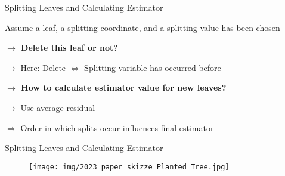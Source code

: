 \documentclass{beamer}
\begin{document}
\begin{frame}{Splitting Leaves and Calculating Estimator}

    Assume a leaf, a splitting coordinate, and a splitting value has been chosen

    \vspace*{.5cm}

    \textbf{$\rightarrow$ Delete this leaf or not?}

    \hspace*{.5cm} $\rightarrow$ Here: Delete \(\Leftrightarrow\) Splitting variable has occurred before

    \vspace*{.5cm}

    \textbf{$\rightarrow$ How to calculate estimator value for new leaves?}

    \begin{center}
    \end{center}

    \hspace*{.5cm} $\rightarrow$ Use average residual
    
    $\Rightarrow$ Order in which splits occur influences final estimator
    


\end{frame}

\begin{frame}{Splitting Leaves and Calculating Estimator}

    \begin{figure}[h]
        \centering
        \vspace{-10pt} %
        \texttt{[image: img/2023\_paper\_skizze\_Planted\_Tree.jpg]}
        \vspace{-10pt}
        \label{fig:Figure_Ewald-MP_Algo_Structure}
    \end{figure}
    
\end{frame}
\end{document}
